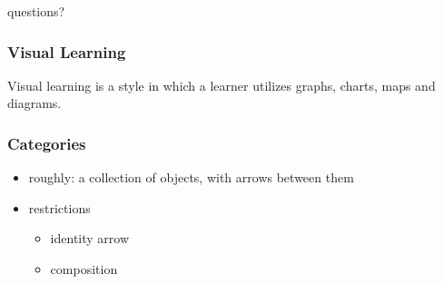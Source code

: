 \documentclass[include/preamble.tex]{subfiles}
\begin{document}
{
  \begin{frame}
    \begin{center}
      questions?
    \end{center}
  \end{frame}
}




\begin{frame}
  \frametitle{Visual Learning}
  \begin{displayquote}
    Visual learning is a style in which a learner
    utilizes graphs, charts, maps and diagrams.
  \end{displayquote}
\end{frame}

\begin{frame}
  \frametitle{Categories}
  \begin{itemize}
  \item roughly: a collection of objects, with arrows between them
  \item restrictions
    \begin{itemize}
    \item identity arrow
    \item composition
    \end{itemize}
  \end{itemize}
\end{frame}
\end{document}
